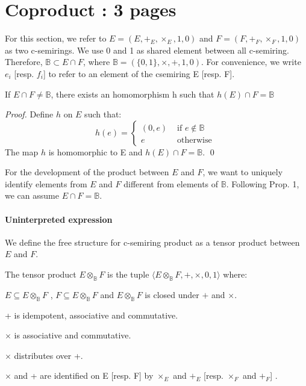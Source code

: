 \section{Coproduct : 3 pages}

For this section, we refer to $E=(E,+_E, \times_E,1,0)$ and $F=(F,+_F, \times_F,1,0 )$ as two c-semirings. 
We use 0 and 1 as shared element between all c-semiring. Therefore, $\mathbb{B} \subset E \cap F$, where $\mathbb{B}= (\{0,1\}, \times,+,1,0 )$. For convenience, we write $e_i$ [resp. $f_i$] to refer to an element of the csemiring E [resp. F].

\begin{proposition}
	If $E \cap F \not = \mathbb{B}$, there exists an homomorphism h such that  $h(E) \cap F = \mathbb{B}$
\end{proposition}
\begin{proof}
	Define $h$ on $E$ such that: $$h(e) = \left\{
	\begin{array}{rl}
	(0,e) & \text{ if } e \not\in \mathbb{B} \\
	e \quad & \text{ otherwise }
	\end{array}
	\right.$$ The map $h$ is homomorphic to E and $h(E) \cap F = \mathbb{B}$.
	\qed
\end{proof}
For the development of the product between $E$ and $F$, we want to uniquely identify elements from $E$ and $F$ different from elements of $\mathbb{B}$. Following Prop. 1, we can assume $E\cap F = \mathbb{B}$. 

\paragraph{Uninterpreted expression}
We define the free structure for c-semiring product as a tensor product between $E$ and $F$.
\begin{definition} The tensor product $E\otimes_{\mathbb{B}}F$ is the tuple $\langle E \otimes_{\mathbb{B}} F, +, \times, 0, 1 \rangle $ where:
	\begin{list}{-}{}
		\item $E \subseteq E \otimes_{\mathbb{B}} F$ , $F \subseteq E \otimes_{\mathbb{B}} F$ and $E \otimes_{\mathbb{B}} F$ is closed under $+$ and $\times$.
		\item + is idempotent, associative and commutative.
		\item $\times$ is associative and commutative.
		\item $\times$ distributes over +.
		\item $\times$ and + are identified on E [resp. F] by $\times_E$ and $+_E$ [resp. $\times_F$ and $+_F$] .
	\end{list}
\end{definition}

